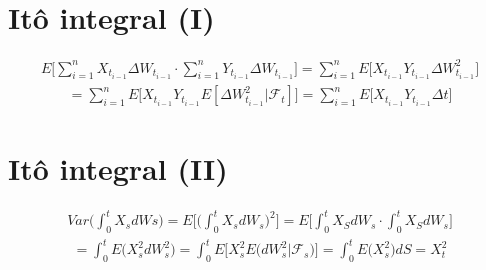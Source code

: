 \documentclass[12pt]{article}
\begin{document}
 

\rhead{\today}
\section{It\^{o} integral (I)}
\begin{align*}
    E\Bigg[\sum_{i=1}^n X_{t_{i-1}} \Delta W_{t_{i-1}}\cdot\sum_{i=1}^n Y_{t_{i-1}} \Delta W_{t_{i-1}}\Bigg] = \sum_{i=1}^n E\Big[X_{t_{i-1}}Y_{t_{i-1}}\Delta W^2_{t_{i-1}}\Big]
\end{align*}
\begin{align*}
    = \sum_{i=1}^n E \Big[X_{t_{i-1}}Y_{t_{i-1}} E[\Delta W^2_{t_{i-1}}|\mathcal{F}_t]\Big] = \sum_{i=1}^n E\Big[X_{t_{i-1}}Y_{t_{i-1}}\Delta t\Big]
\end{align*}
\section{It\^{o} integral (II)}
\begin{align*}
    Var\Bigg(\int_{0}^t X_s dWs\Bigg) = E\Bigg[\Bigg(\int_0^t X_s dW_s\Bigg)^2\Bigg] = E\Bigg[\int_0^t X_S dW_s \cdot \int_0^t X_S dW_s \Bigg]
\end{align*}
\begin{align*}
    = \int_{0}^t E\Big(X_s^2 dW_s^2\Big) = \int_0^t E\Bigg[X_s^2E\Big(dW_s^2|\mathcal{F}_s\Big)\Bigg] = \int_0^t E\Big(X_s^2\Big)dS = X_t^2
\end{align*}
\end{document}
